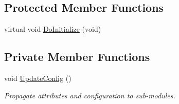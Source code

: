 \subsection*{Protected Member Functions}
\begin{DoxyCompactItemize}
\item 
virtual void \hyperlink{classns3_1_1LteEnbNetDevice_acdd07ecc442b6edad44ac28c02b95886}{Do\+Initialize} (void)
\end{DoxyCompactItemize}
\subsection*{Private Member Functions}
\begin{DoxyCompactItemize}
\item 
void \hyperlink{classns3_1_1LteEnbNetDevice_a19c231b7934d89c39d51fd91304b1582}{Update\+Config} ()
\begin{DoxyCompactList}\small\item\em Propagate attributes and configuration to sub-\/modules. \end{DoxyCompactList}\end{DoxyCompactItemize}
